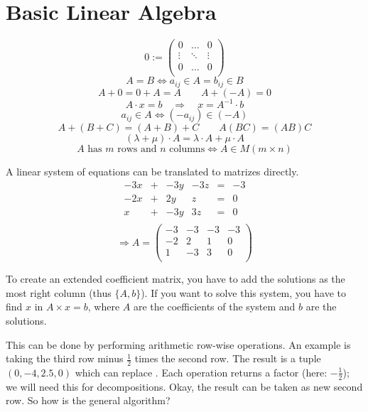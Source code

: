 \documentclass[a4paper,twocolumn]{article}
\begin{document}
\tableofcontents

\section{Basic Linear Algebra}

\[
    0 := \begin{pmatrix}
        0 & \ldots & 0 \\
        \vdots & \ddots & \vdots \\
        0 & \ldots & 0 \\
    \end{pmatrix}
\] \[
    A = B \Leftrightarrow a_{ij} \in A = b_{ij} \in B
\] \[
    A + 0 = 0 + A = A
    \qquad
    A + (-A) = 0
\] \[
    A \cdot x = b
    \quad\Rightarrow\quad
    x = A^{-1} \cdot b
\] \[
    a_{ij} \in A \Leftrightarrow (-a_{ij}) \in (-A)
\] \[
    A + (B + C) = (A + B) + C
    \qquad
    A(BC) = (AB)C
\] \[
    (\lambda + \mu) \cdot A = \lambda \cdot A + \mu \cdot A
\] \[
    A \text{ has $m$ rows and $n$ columns}
        \Leftrightarrow A \in M(m\times n)
\]

A linear system of equations can be translated to matrizes
directly.
%
\[
    \begin{array}{cccccc}
        -3x & + & -3y & -3z & = & -3 \\
        -2x & + &  2y &   z & = & 0 \\
          x & + & -3y &  3z & = & 0 \\
    \end{array}
\] \[
    \Rightarrow
    A = \left(\begin{array}{cccc}
        -3 & -3 & -3 & -3 \\
        -2 &  2 &  1 & 0 \\
         1 & -3 &  3 & 0 \\
    \end{array}\right)
\]

To create an extended coefficient matrix, you have to add the solutions
as the most right column (thus $\{A, b\}$).
If you want to solve this system, you have to find $x$ in
$A\times x = b$, where $A$ are the coefficients of the system and
$b$ are the solutions.

This can be done by performing arithmetic row-wise operations.
An example is taking the third row minus $\frac12$ times the second
row. The result is a tuple $(0, -4, 2.5, 0)$ which can replace . Each operation returns
a factor (here: $-\frac12$); we will need this for decompositions.
Okay, the result can be taken as new second row. So how is the general
algorithm?
\end{document}
